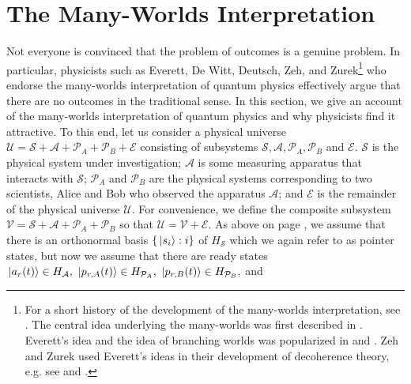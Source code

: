  
    \section{The Many-Worlds Interpretation}\label{manyworldsinterpretation1}
    Not everyone is convinced that the problem of outcomes is a genuine problem. In particular, physicists such as Everett, De Witt, Deutsch, Zeh, and Zurek\footnote{For a short history of the development of the many-worlds interpretation, see \cite[336--337]{Schlosshauer}. The central idea underlying the many-worlds was first described in \cite{EverettHugh1957RSFo}. Everett's idea and the idea of branching worlds was popularized in \cite{DeWittBryceS.1970Qmar} and \cite{DEUTSCHD1985Qtaa}. Zeh and Zurek used Everett's ideas in their development of decoherence theory, e.g. see \cite{ZehH.D.1993Tanq} and \cite{ZurekWojciechH.1998Deat}.} who endorse the many-worlds interpretation of quantum physics effectively argue that there are no outcomes in the traditional sense. In this section, we give an account of the many-worlds interpretation of quantum physics and why physicists find it attractive. To this end, let us consider a physical universe $\mathcal{U}=\mathcal{S}+\mathcal{A}+\mathcal{P}_A+\mathcal{P}_B+\mathcal{E}$ consisting of subsystems $\mathcal{S}, \mathcal{A}, \mathcal{P}_A,\mathcal{P}_B$  %
%
    and $\mathcal{E}$. $\mathcal{S}$ is the physical system under investigation; $\mathcal{A}$ is some measuring apparatus that interacts with $\mathcal{S}$; $\mathcal{P}_A$ and $\mathcal{P}_B$ are the physical systems corresponding to two scientists, Alice and Bob who observed the apparatus $\mathcal{A}$; and $\mathcal{E}$ is the remainder of the physical universe $\mathcal{U}$.  For convenience, we define the composite subsystem $\mathcal{V}=\mathcal{S}+\mathcal{A}+\mathcal{P}_A+\mathcal{P}_B$ %
%
    so that $\mathcal{U}=\mathcal{V}+\mathcal{E}$. As above on page \pageref{pointer}, we  assume that there is an orthonormal basis $\{\ket*{s_i}:i\}$ of $H_\mathcal{S}$ which we again refer to as pointer states, but now we assume that there are ready states $\ket*{a_r(t)}\in H_\mathcal{A},\,\ket*{p_{r, A}(t)}\in H_{\mathcal{P}_A},\,\ket*{p_{r, B}(t)}\in H_{\mathcal{P}_B},$ and  %
%
